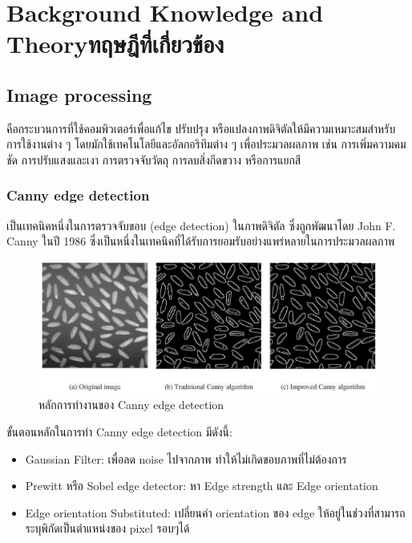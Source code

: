 \chapter{\ifenglish Background Knowledge and Theory\else ทฤษฎีที่เกี่ยวข้อง\fi}

\section{Image processing}

คือกระบวนการที่ใช้คอมพิวเตอร์เพื่อแก้ไข ปรับปรุง หรือแปลงภาพดิจิตัลให้มีความเหมาะสมสำหรับการใช้งานต่าง ๆ โดยมักใช้เทคโนโลยีและอัลกอริทึมต่าง ๆ เพื่อประมวลผลภาพ เช่น การเพิ่มความคมชัด การปรับแสงและเงา การตรวจจับวัตถุ การลบสิ่งกีดขวาง หรือการแยกสี

\subsection{Canny edge detection}

เป็นเทคนิคหนึ่งในการตรวจจับขอบ (edge detection) ในภาพดิจิตัล ซึ่งถูกพัฒนาโดย John F. Canny ในปี 1986 ซึ่งเป็นหนึ่งในเทคนิคที่ได้รับการยอมรับอย่างแพร่หลายในการประมวลผลภาพ

\begin{figure}[h!]
  \begin{center}
    \includegraphics{2_1.png}
  \end{center}
  \caption[Poem]{หลักการทำงานของ Canny edge detection}
\end{figure}

ขั้นตอนหลักในการทำ Canny edge detection มีดังนี้:

\begin{itemize}
  \item {Gaussian Filter: เพื่อลด noise ไปจากภาพ ทำให้ไม่เกิดขอบภาพที่ไม่ต้องการ}
  \item {Prewitt หรือ Sobel edge detector: หา Edge strength และ Edge orientation}
  \item {Edge orientation Substituted: เปลี่ยนค่า orientation ของ edge ให้อยู่ในช่วงที่สามารถระบุพิกัดเป็นตำแหน่งของ pixel รอบๆได้}
\end{itemize}


